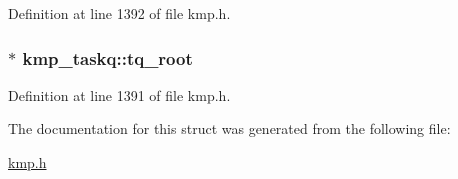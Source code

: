 Definition at line 1392 of file kmp.\-h.

\hypertarget{structkmp__taskq_aafe42b67e85280d38e2e8277428c9cc8}{
\subsubsection[{tq\-\_\-root}]{$\ast$ kmp\-\_\-taskq\-::tq\-\_\-root}}\label{structkmp__taskq_aafe42b67e85280d38e2e8277428c9cc8}


Definition at line 1391 of file kmp.\-h.



The documentation for this struct was generated from the following file\-:\begin{DoxyCompactItemize}
\item 
\hyperlink{kmp_8h}{kmp.\-h}\end{DoxyCompactItemize}
